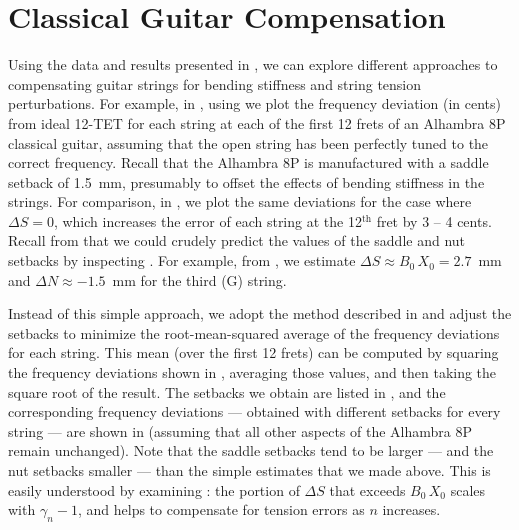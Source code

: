 %
%
%

 \section{Classical Guitar Compensation\label{sct:comp}}

Using the data and results presented in , we can explore different approaches to compensating guitar strings for bending stiffness and string tension perturbations. For example, in , using  we plot the frequency deviation (in cents) from ideal 12-TET for each string at each of the first 12 frets of an Alhambra 8P classical guitar, assuming that the open string has been perfectly tuned to the correct frequency. Recall that the Alhambra 8P is manufactured with a saddle setback of 1.5~mm, presumably to offset the effects of bending stiffness in the strings. For comparison, in , we plot the same deviations for the case where $\Delta S = 0$, which increases the error of each string at the 12$^\text{th}$ fret by 3 -- 4 cents. Recall from  that we could crudely predict the values of the saddle and nut setbacks by inspecting . For example, from , we estimate $\Delta S \approx B_0\, X_0 = 2.7$~mm and $\Delta N \approx -1.5$~mm for the third (G) string.

Instead of this simple approach, we adopt the method described in  and adjust the setbacks to minimize the root-mean-squared average of the frequency deviations for each string. This mean (over the first 12 frets) can be computed by squaring the frequency deviations shown in , averaging those values, and then taking the square root of the result. The setbacks we obtain are listed in , and the corresponding frequency deviations --- obtained with different setbacks for every string --- are shown in  (assuming that all other aspects of the Alhambra 8P remain unchanged). Note that the saddle setbacks tend to be larger --- and the nut setbacks smaller --- than the simple estimates that we made above. This is easily understood by examining : the portion of $\Delta S$ that exceeds $B_0\, X_0$ scales with $\gamma_n - 1$, and helps to compensate for tension errors as $n$ increases.

